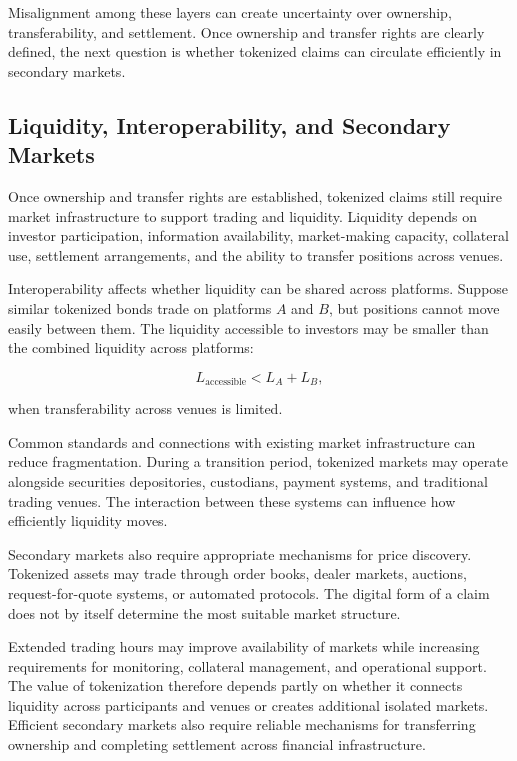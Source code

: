 Misalignment among these layers can create uncertainty over ownership, transferability, and settlement. Once ownership and transfer rights are clearly defined, the next question is whether tokenized claims can circulate efficiently in secondary markets.

\subsection{Liquidity, Interoperability, and Secondary Markets}

Once ownership and transfer rights are established, tokenized claims still require market infrastructure to support trading and liquidity. Liquidity depends on investor participation, information availability, market-making capacity, collateral use, settlement arrangements, and the ability to transfer positions across venues.

Interoperability affects whether liquidity can be shared across platforms. Suppose similar tokenized bonds trade on platforms \(A\) and \(B\), but positions cannot move easily between them. The liquidity accessible to investors may be smaller than the combined liquidity across platforms:

\begin{equation}
L_{\mathrm{accessible}}<L_A+L_B,
\label{eq:ch24-fragmented-liquidity}
\end{equation}

when transferability across venues is limited.

Common standards and connections with existing market infrastructure can reduce fragmentation. During a transition period, tokenized markets may operate alongside securities depositories, custodians, payment systems, and traditional trading venues. The interaction between these systems can influence how efficiently liquidity moves.

Secondary markets also require appropriate mechanisms for price discovery. Tokenized assets may trade through order books, dealer markets, auctions, request-for-quote systems, or automated protocols. The digital form of a claim does not by itself determine the most suitable market structure.

Extended trading hours may improve availability of markets while increasing requirements for monitoring, collateral management, and operational support. The value of tokenization therefore depends partly on whether it connects liquidity across participants and venues or creates additional isolated markets.
Efficient secondary markets also require reliable mechanisms for transferring ownership and completing settlement across financial infrastructure.



